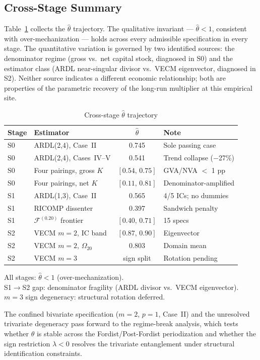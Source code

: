 \subsection{Cross-Stage Summary}
\label{subsec:cross_stage}

Table~\ref{tab:cross_theta} collects the $\hat{\theta}$ trajectory. The
qualitative invariant --- $\hat{\theta} < 1$, consistent with
over-mechanization --- holds across every admissible specification in every
stage. The quantitative variation is governed by two identified sources: the
denominator regime (gross vs.\ net capital stock, diagnosed in S0) and the
estimator class (ARDL near-singular divisor vs.\ VECM eigenvector, diagnosed
in S2). Neither source indicates a different economic relationship; both are
properties of the parametric recovery of the long-run multiplier at this
empirical site.

\begin{table}[!ht]
	\centering
	\small
	\caption{Cross-stage $\hat{\theta}$ trajectory}
	\label{tab:cross_theta}
	\begin{tabular}{llcl}
		\hline\hline
		Stage & Estimator & $\hat{\theta}$ & Note \\
		\hline
		S0 & ARDL(2,4), Case~II & 0.745 &
		Sole passing case \\
		S0 & ARDL(2,4), Cases~IV--V & 0.541 &
		Trend collapse ($-$27\%) \\
		S0 & Four pairings, gross $K$ & $[0.54,\, 0.75]$ &
		GVA/NVA $<$ 1 pp \\
		S0 & Four pairings, net $K$ & $[0.11,\, 0.81]$ &
		Denominator-amplified \\
		\hline
		S1 & ARDL(1,3), Case~II & 0.565 &
		4/5 ICs; no dummies \\
		S1 & RICOMP dissenter & 0.397 &
		Sandwich penalty \\
		S1 & $\mathcal{F}^{(0.20)}$ frontier & $[0.40,\, 0.71]$ &
		15 specs \\
		\hline
		S2 & VECM $m\!=\!2$, IC band & $[0.87,\, 0.90]$ &
		Eigenvector \\
		S2 & VECM $m\!=\!2$, $\Omega_{20}$ & 0.803 &
		Domain mean \\
		S2 & VECM $m\!=\!3$ & sign split &
		Rotation pending \\
		\hline
	\end{tabular}
	\par\vspace{0.3em}
	\footnotesize
	All stages: $\hat{\theta} < 1$ (over-mechanization). \\
	S1$\to$S2 gap: denominator fragility (ARDL divisor vs.\ VECM eigenvector). \\
	$m=3$ sign degeneracy: structural rotation deferred.
\end{table}

\noindent
The confined bivariate specification ($m = 2$, $p = 1$, Case~II) and the
unresolved trivariate degeneracy pass forward to the regime-break analysis,
which tests whether $\hat{\theta}$ is stable across the
Fordist/Post-Fordist periodization and whether the sign restriction
$\lambda < 0$ resolves the trivariate entanglement under structural
identification constraints.
